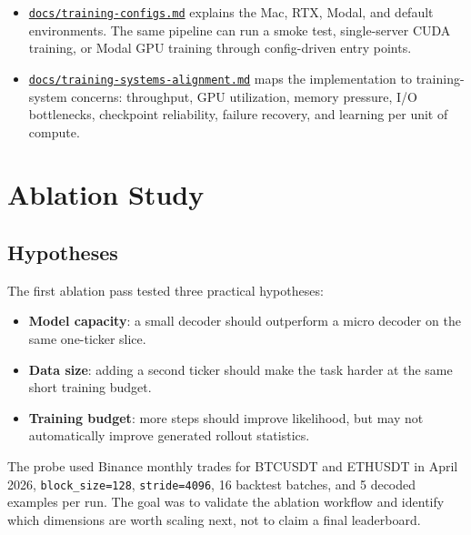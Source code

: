 \documentclass[11pt]{article}
\begin{document}
\begin{itemize}
    profiler investigation. The baseline CPU optimizer window was 323.645 ms
    over two optimizer updates; after the shape-bucketed Muon optimization with
    \texttt{training.muon\_ns\_steps=3}, it dropped to about 20.018 ms.
    \item \href{https://github.com/duoan/mega-trading/blob/main/docs/training-configs.md}{\texttt{docs/training-configs.md}} explains the Mac, RTX, Modal, and
    default environments. The same pipeline can run a smoke test, single-server
    CUDA training, or Modal GPU training through config-driven entry points.
    \item \href{https://github.com/duoan/mega-trading/blob/main/docs/training-systems-alignment.md}{\texttt{docs/training-systems-alignment.md}} maps the implementation
    to training-system concerns: throughput, GPU utilization, memory pressure,
    I/O bottlenecks, checkpoint reliability, failure recovery, and learning per
    unit of compute.
\end{itemize}

\section{Ablation Study}

\subsection*{Hypotheses}

The first ablation pass tested three practical hypotheses:

\begin{itemize}[leftmargin=1.6em]
  \item \textbf{Model capacity}: a small decoder should outperform a micro
  decoder on the same one-ticker slice.
  \item \textbf{Data size}: adding a second ticker should make the task harder
  at the same short training budget.
  \item \textbf{Training budget}: more steps should improve likelihood, but may
  not automatically improve generated rollout statistics.
\end{itemize}

The probe used Binance monthly trades for BTCUSDT and ETHUSDT in April 2026,
\texttt{block\_size=128}, \texttt{stride=4096}, 16 backtest batches, and 5
decoded examples per run. The goal was to validate the ablation workflow and
identify which dimensions are worth scaling next, not to claim a final
leaderboard.
\end{document}
